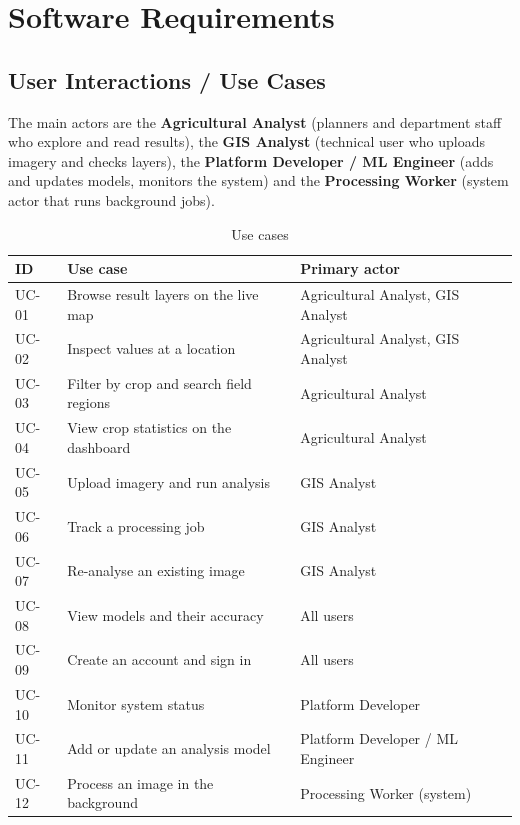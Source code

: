 \chapter{Software Requirements}

\section{User Interactions / Use Cases}
The main actors are the \textbf{Agricultural Analyst} (planners and department staff who explore and
read results), the \textbf{GIS Analyst} (technical user who uploads imagery and checks layers), the
\textbf{Platform Developer / ML Engineer} (adds and updates models, monitors the system) and the
\textbf{Processing Worker} (system actor that runs background jobs).

\begin{table}[htbp]
\centering\small
\caption{Use cases}
\label{tab:usecases}
\begin{tabularx}{\textwidth}{L{1.1cm} L{4.6cm} Y}
\toprule
\textbf{ID} & \textbf{Use case} & \textbf{Primary actor}\\
\midrule
UC-01 & Browse result layers on the live map & Agricultural Analyst, GIS Analyst\\
UC-02 & Inspect values at a location & Agricultural Analyst, GIS Analyst\\
UC-03 & Filter by crop and search field regions & Agricultural Analyst\\
UC-04 & View crop statistics on the dashboard & Agricultural Analyst\\
UC-05 & Upload imagery and run analysis & GIS Analyst\\
UC-06 & Track a processing job & GIS Analyst\\
UC-07 & Re-analyse an existing image & GIS Analyst\\
UC-08 & View models and their accuracy & All users\\
UC-09 & Create an account and sign in & All users\\
UC-10 & Monitor system status & Platform Developer\\
UC-11 & Add or update an analysis model & Platform Developer / ML Engineer\\
UC-12 & Process an image in the background & Processing Worker (system)\\
\bottomrule
\end{tabularx}
\end{table}

